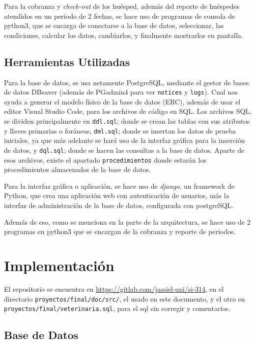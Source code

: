 \documentclass[
  12pt,
  hidelinks,
  a4paper,
  headings=standardclasses,
  headings=big,
  spanish
]{scrartcl}
\begin{document}
Para la cobranza y \emph{check-out} de los huésped, además del reporte de huéspedes atendidos en un periodo de 2 fechas, se hace uso de programas de consola de python3, que se encarga de conectarse a la base de datos, seleccionar, las condiciones, calcular los datos, cambiarlos, y finalmente mostrarlos en pantalla.

\subsection{Herramientas Utilizadas} %

Para la base de datos, se usa netamente PostgreSQL, mediante el gestor de bases de datos DBeaver (además de PGadmin4 para ver \texttt{notices} y \texttt{logs}).
Cual nos ayuda a generar el modelo físico de la base de datos (ERC), además de usar el editor Visual Studio Code, para los archivos de código en SQL\@.
Los archivos SQL, se dividen principalmente en \texttt{ddl.sql}; donde se crean las tablas con sus atributos y llaves primarias o foráneas, \texttt{dml.sql}; donde se insertan los datos de prueba iniciales, ya que más adelante se hará uso de la interfaz gráfica para la inserción de datos, y \texttt{dql.sql}; donde se hacen las consultas a la base de datos.
Aparte de esos archivos, existe el apartado \texttt{procedimientos} donde estarán los procedimientos almacenados de la base de datos.

Para la interfaz gráfica o aplicación, se hace uso de \emph{django}, un framework de Python, que crea una aplicación web con autenticación de usuarios, más la interfaz de administración de la base de datos, configurada con postgreSQL\@.

Además de eso, como se menciona en la parte de la arquitectura, se hace uso de 2 programas en python3 que se encargan de la cobranza y reporte de periodos.

\pagebreak
\section{Implementación}

El repositorio se encuentra en \url{https://gitlab.com/jassiel-uni/si-314}, en el directorio \texttt{proyectos/final/doc/src/}, el usado en este documento, y el otro en \texttt{proyectos/final/veterinaria.sql}, para el sql sin corregir y comentarios.

\subsection{Base de Datos}
\end{document}

